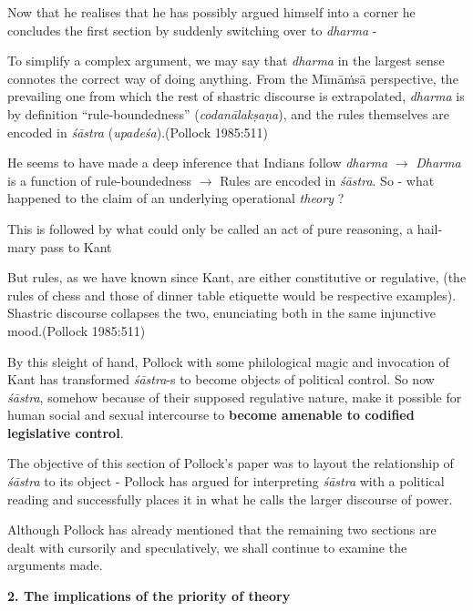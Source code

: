 Now that he realises that he has possibly argued himself into a corner he concludes the first section by suddenly switching over to {\sl dharma} - 
\begin{myquote}
To simplify a complex argument, we may say that {\sl dharma} in the largest sense connotes the correct way of doing anything. From the Mīmāṁsā perspective, the prevailing one from which the rest of shastric discourse is extrapolated, {\sl dharma} is by definition ``rule-boundedness'' ({\sl codanālakṣaṇa}), and the rules themselves are encoded in {\sl śāstra} ({\sl upadeśa}).\hfill (Pollock 1985:511)
\end{myquote}

He seems to have made a deep inference that Indians follow {\sl dharma} $\to$ {\sl Dharma} is a function of rule-boundedness $\to$ Rules are encoded in {\sl śāstra}. So - what happened to the claim of an underlying operational {\sl theory} ?

This is followed by what could only be called an act of pure reasoning, a hail-mary pass to Kant
\begin{myquote}
But rules, as we have known since Kant, are either constitutive or regulative, (the rules of chess and those of dinner table etiquette would be respective examples). Shastric discourse collapses the two, enunciating both in the same injunctive mood.\hfill (Pollock 1985:511)
\end{myquote}

By this sleight of hand, Pollock with some philological magic and invocation of Kant has transformed {\sl śāstra}-s to become objects of political control. So now {\sl śāstra}, somehow because of their supposed regulative nature, make it possible for human social and sexual intercourse to {\bf become amenable to codified legislative control}.

The objective of this section of Pollock's paper was to layout the relationship of {\sl śāstra} to its object - Pollock has argued for interpreting {\sl śāstra} with a political reading and successfully places it in what he calls the larger discourse of power.

Although Pollock has already mentioned that the remaining two sections are dealt with cursorily and speculatively, we shall continue to examine the arguments made.

{\bf 2. The implications of the priority of theory}

